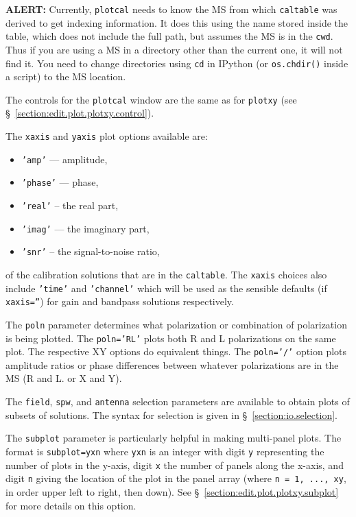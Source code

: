 {\bf ALERT:} Currently, {\tt plotcal} needs to know the MS from
which {\tt caltable} was derived to get indexing information.  It does
this using the name stored inside the table, which does not include
the full path, but assumes the MS is in the {\tt cwd}.  Thus if you
are using a MS in a directory other than the current one, it will not
find it.  You need to change directories using {\tt cd} in
IPython (or {\tt os.chdir()} inside a script) to the MS location.

The controls for the {\tt plotcal} window are the same as for
{\tt plotxy} (see \S~\ref{section:edit.plot.plotxy.control}).

The {\tt xaxis} and {\tt yaxis} plot options available are:
\begin{itemize}
   \item {\tt 'amp'} --- amplitude,
   \item {\tt 'phase'} --- phase,
   \item {\tt 'real'} -- the real part,
   \item {\tt 'imag'} --- the imaginary part,
   \item {\tt 'snr'} -- the signal-to-noise ratio,
\end{itemize}
of the calibration solutions that are in the {\tt caltable}.
The {\tt xaxis} choices also include {\tt 'time'} and {\tt 'channel'}
which will be used as the sensible defaults (if {\tt xaxis=''}) for
gain and bandpass solutions respectively.

The {\tt poln} parameter determines what polarization or combination of
polarization is being plotted.  The {\tt poln='RL'} plots both
R and L polarizations on the same plot.  The respective XY options do
equivalent things.  The {\tt poln='/'} option
plots amplitude ratios or phase differences between whatever
polarizations are in the MS (R and L. or X and Y).  

The {\tt field}, {\tt spw}, and {\tt antenna} selection parameters are
available to obtain plots of subsets of solutions.  The syntax for 
selection is given in \S~\ref{section:io.selection}.

The {\tt subplot} parameter is particularly helpful in making 
multi-panel plots.  The format is  
{\tt subplot=yxn} where {\tt yxn} is an integer with digit
{\tt y} representing the number of plots in the y-axis, digit
{\tt x} the number of panels along the x-axis, and digit {\tt n}
giving the location of the plot in the panel array (where
{\tt n = 1, ..., xy}, in order upper left to right, then down).
See \S~\ref{section:edit.plot.plotxy.subplot} for more details on this
option.

